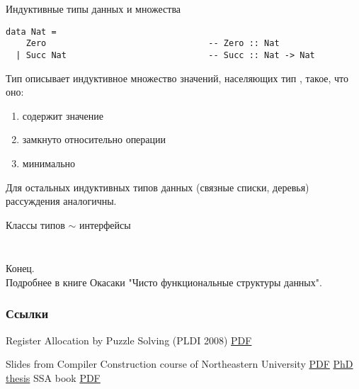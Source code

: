 \documentclass[aspectratio=169
  , xcolor={svgnames}
  , hyperref={ colorlinks,citecolor=DeepPink4
             , linkcolor=DarkRed,urlcolor=DarkBlue}
  , russian
  ]{beamer}
\theoremstyle{exerciseStyle1}
\begin{document}
\begin{frame}[fragile]{Индуктивные типы данных и множества}
\begin{verbatim}
data Nat = 
    Zero                                -- Zero :: Nat
  | Succ Nat                            -- Succ :: Nat -> Nat
\end{verbatim}
Тип  описывает индуктивное множество значений, населяющих тип , такое, что оно:
\begin{enumerate}
  \item содержит значение 
  \item замкнуто относительно операции 
  \item минимально
\end{enumerate}

Для остальных индуктивных типов данных (связные списки, деревья) рассуждения аналогичны.
\end{frame}

\begin{frame}[fragile]{Классы типов $\sim$ интерфейсы}
\begin{minipage}{.48\textwidth}
  \inputminted[firstline=9,lastline=15]{haskell}{code/Stacks.hs}
\end{minipage}
\begin{minipage}{.48\textwidth}
  \inputminted[firstline=16,lastline=26]{haskell}{code/Stacks.hs}
\end{minipage}
\end{frame}

%
%
%
%
%


\begin{frame}
\begin{center}
  {\Huge Конец.}\\
  
  Подробнее в книге Окасаки "Чисто функциональные структуры данных".
\end{center}
\end{frame}


 \begin{frame}[allowframebreaks]
   \frametitle<presentation>{Ссылки}
   \begin{thebibliography}{10}
     Register Allocation by Puzzle Solving (PLDI 2008)
     \newblock \href{http://conal.net/papers/compiling-to-categories/compiling-to-categories.pdf}{PDF}
           
     Slides from Compiler Construction course of Northeastern University
     \newblock \href{https://users.cs.northwestern.edu/~robby/courses/322-2016-spring/puzzle_solving.pdf}{PDF}
     \href{http://compilers.cs.ucla.edu/fernando/publications/papers/PhdDiss.pdf}{PhD thesis}
      SSA book
     \href{http://ssabook.gforge.inria.fr/latest/book.pdf}{PDF} 
   \end{thebibliography}
 \end{frame}
\end{document}
